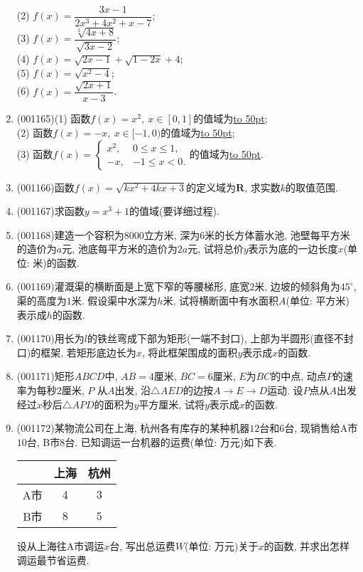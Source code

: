 \documentclass[10pt,a4paper]{article}
\newcommand{\blank}[1]{\underline{\hbox to #1pt{}}}
\begin{document}
\begin{enumerate}[1.]
(2) $f(x)=\dfrac{3x-1}{2x^3+4x^2+x-7}$;\\ 
(3) $f(x)=\dfrac{\sqrt[3]{4x+8}}{\sqrt{3x-2}}$;\\ 
(4) $f(x)=\sqrt{2x-1}+\sqrt{1-2x}+4$;\\ 
(5) $f(x)=\sqrt{x^2-4}$;\\ 
(6) $f(x)=\dfrac{\sqrt{2x+1}}{x-3}$.
\item {\tiny (001165)}(1) 函数$f(x)=x^2, \ x \in [0,1]$的值域为\blank{50};\\ 
(2) 函数$f(x)=-x, \ x \in [-1,0)$的值域为\blank{50};\\ 
(3) 函数$f(x)=\left\{\begin{array}{cc}x^2,&0\le x\le 1,\\-x,&-1\le x<0.\end{array}\right.$的值域为\blank{50}.
\item {\tiny (001166)}函数$f(x)=\sqrt{kx^2+4kx+3}$的定义域为$\mathbf{R}$, 求实数$k$的取值范围.
\item {\tiny (001167)}求函数$y=x^3+1$的值域(要详细过程).
\item {\tiny (001168)}建造一个容积为$8000$立方米, 深为$6$米的长方体蓄水池, 池壁每平方米的造价为$a$元, 池底每平方米的造价为$2a$元, 试将总价$y$表示为底的一边长度$x$(单位: 米)的函数.
\item {\tiny (001169)}灌溉渠的横断面是上宽下窄的等腰梯形, 底宽$2$米, 边坡的倾斜角为$45^\circ$, 渠的高度为$1$米. 假设渠中水深为$h$米, 试将横断面中有水面积$A$(单位: 平方米)表示成$h$的函数.
\item {\tiny (001170)}用长为$l$的铁丝弯成下部为矩形(一端不封口), 上部为半圆形(直径不封口)的框架, 若矩形底边长为$x$, 将此框架围成的面积$y$表示成$x$的函数.
\item {\tiny (001171)}矩形$ABCD$中, $AB=4$厘米, $BC=6$厘米, $E$为$BC$的中点, 动点$P$的速率为每秒$2$厘米, $P$
从$A$出发, 沿$\triangle AED$的边按$A\rightarrow E\rightarrow D$运动. 设$P$点从$A$出发经过$x$秒后$\triangle APD$的面积为$y$平方厘米, 试将$y$表示成$x$的函数.
\item {\tiny (001172)}某物流公司在上海, 杭州各有库存的某种机器$12$台和$6$台, 现销售给A市$10$台, B市$8$台. 已知调运一台机器的运费(单位: 万元)如下表.
\begin{center}\begin{tabular}{c|cc}
&上海& 杭州\\
\hline
A市 & $4$ & $3$\\
B市 & $8$ & $5$
\end{tabular}\end{center}
设从上海往A市调运$x$台, 写出总运费$W$(单位: 万元)关于$x$的函数, 并求出怎样调运最节省运费.

\end{enumerate}
\end{document}
